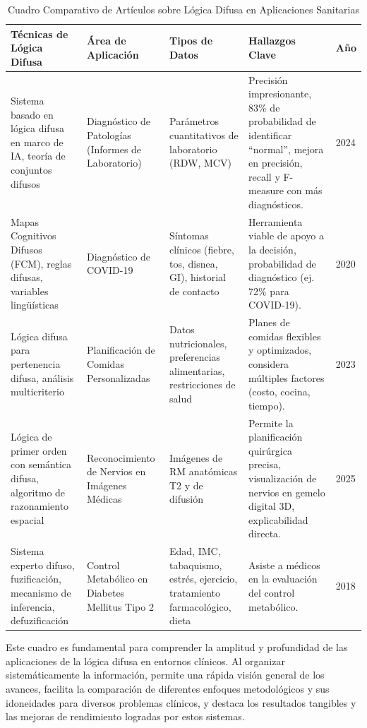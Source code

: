 \begin{table}[htbp]
\centering
\caption{Cuadro Comparativo de Artículos sobre Lógica Difusa en Aplicaciones Sanitarias}
\label{tab:comparativo_logica_difusa}
\begin{tabular}{@{}p{3cm}p{2.5cm}p{2.5cm}p{4cm}p{1.5cm}@{}}
\toprule
\textbf{Técnicas de Lógica Difusa} & \textbf{Área de Aplicación} & \textbf{Tipos de Datos} & \textbf{Hallazgos Clave} & \textbf{Año} \\
\midrule
Sistema basado en lógica difusa en marco de IA, teoría de conjuntos difusos & Diagnóstico de Patologías (Informes de Laboratorio) & Parámetros cuantitativos de laboratorio (RDW, MCV) & Precisión impresionante, 83\% de probabilidad de identificar ``normal'', mejora en precisión, recall y F-measure con más diagnósticos. & 2024 \\
\midrule
Mapas Cognitivos Difusos (FCM), reglas difusas, variables lingüísticas & Diagnóstico de COVID-19 & Síntomas clínicos (fiebre, tos, disnea, GI), historial de contacto & Herramienta viable de apoyo a la decisión, probabilidad de diagnóstico (ej. 72\% para COVID-19). & 2020 \\
\midrule
Lógica difusa para pertenencia difusa, análisis multicriterio & Planificación de Comidas Personalizadas & Datos nutricionales, preferencias alimentarias, restricciones de salud & Planes de comidas flexibles y optimizados, considera múltiples factores (costo, cocina, tiempo). & 2023 \\
\midrule
Lógica de primer orden con semántica difusa, algoritmo de razonamiento espacial & Reconocimiento de Nervios en Imágenes Médicas & Imágenes de RM anatómicas T2 y de difusión & Permite la planificación quirúrgica precisa, visualización de nervios en gemelo digital 3D, explicabilidad directa. & 2025 \\
\midrule
Sistema experto difuso, fuzificación, mecanismo de inferencia, defuzificación & Control Metabólico en Diabetes Mellitus Tipo 2 & Edad, IMC, tabaquismo, estrés, ejercicio, tratamiento farmacológico, dieta & Asiste a médicos en la evaluación del control metabólico. & 2018 \\
\bottomrule
\end{tabular}
\end{table}

Este cuadro es fundamental para comprender la amplitud y profundidad de las aplicaciones de la lógica difusa en entornos clínicos. Al organizar sistemáticamente la información, permite una rápida visión general de los avances, facilita la comparación de diferentes enfoques metodológicos y sus idoneidades para diversos problemas clínicos, y destaca los resultados tangibles y las mejoras de rendimiento logradas por estos sistemas.

